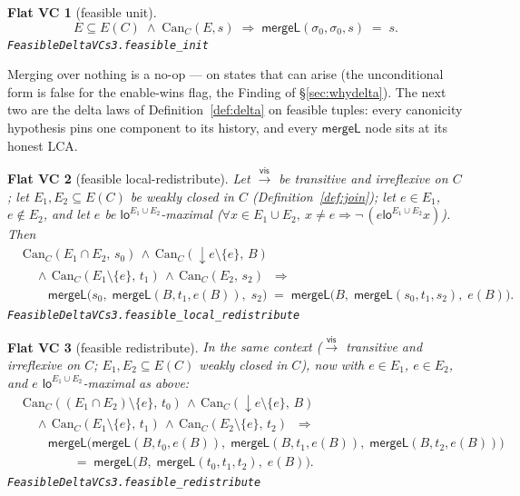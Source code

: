 \documentclass[11pt]{article}
\newtheorem{fvc}{Flat VC}
\newcommand{\vis}{\xrightarrow{\mathsf{vis}}}
\newcommand{\mergeL}{\mathsf{mergeL}}
\newcommand{\Sinit}{\sigma_0}
\newcommand{\loE}[1]{\mathsf{lo}^{#1}}
\newcommand{\dow}[1]{{\downarrow}#1}
\newcommand{\lean}[1]{\texttt{#1}}
\begin{document}
\begin{fvc}[feasible unit]
\label{fvc:unit}
\[
  E \subseteq E(C) \;\wedge\; \mathrm{Can}_C(E, s)
  \;\Longrightarrow\;
  \mergeL(\Sinit, \Sinit, s) \;=\; s .
\]
\hfill\lean{FeasibleDeltaVCs3.feasible\_init}
\end{fvc}

Merging over nothing is a no-op --- on states that can arise (the
unconditional form is false for the enable-wins flag, the Finding of
\S\ref{sec:whydelta}). The next two are the delta laws of
Definition~\ref{def:delta} on feasible tuples: every canonicity
hypothesis pins one component to its history, and every $\mergeL$ node
sits at its honest LCA.

\begin{fvc}[feasible local-redistribute]
\label{fvc:lredist}
Let $\vis$ be transitive and irreflexive on $C$; let
$E_1, E_2 \subseteq E(C)$ be weakly closed in $C$
(Definition~\ref{def:join}); let $e \in E_1$, $e \notin E_2$, and let
$e$ be $\loE{E_1 \cup E_2}$-maximal
($\forall x \in E_1 \cup E_2,\ x \neq e \Rightarrow
\neg\, (e \mathrel{\loE{E_1 \cup E_2}} x)$). Then
\[
\begin{aligned}
  &\mathrm{Can}_C(E_1 \cap E_2,\, s_0) \,\wedge\,
   \mathrm{Can}_C(\dow{e} \setminus \{e\},\, B) \\
  &\quad{}\wedge\,
   \mathrm{Can}_C(E_1 \setminus \{e\},\, t_1) \,\wedge\,
   \mathrm{Can}_C(E_2,\, s_2)
  \;\;\Longrightarrow\;\;\\
  &\qquad
   \mergeL\bigl(s_0,\; \mergeL(B, t_1, e(B)),\; s_2\bigr)
   \;=\;
   \mergeL\bigl(B,\; \mergeL(s_0, t_1, s_2),\; e(B)\bigr).
\end{aligned}
\]
\hfill\lean{FeasibleDeltaVCs3.feasible\_local\_redistribute}
\end{fvc}

\begin{fvc}[feasible redistribute]
\label{fvc:redist}
In the same context ($\vis$ transitive and irreflexive on $C$;
$E_1, E_2 \subseteq E(C)$ weakly closed in $C$), now with $e \in E_1$,
$e \in E_2$, and $e$ $\loE{E_1 \cup E_2}$-maximal as above:
\[
\begin{aligned}
  &\mathrm{Can}_C((E_1 \cap E_2) \setminus \{e\},\, t_0) \,\wedge\,
   \mathrm{Can}_C(\dow{e} \setminus \{e\},\, B) \\
  &\quad{}\wedge\,
   \mathrm{Can}_C(E_1 \setminus \{e\},\, t_1) \,\wedge\,
   \mathrm{Can}_C(E_2 \setminus \{e\},\, t_2)
  \;\;\Longrightarrow\;\;\\
  &\qquad
  \mergeL\bigl(\mergeL(B, t_0, e(B)),\; \mergeL(B, t_1, e(B)),\;
    \mergeL(B, t_2, e(B))\bigr) \\
  &\qquad\qquad=\;
  \mergeL\bigl(B,\; \mergeL(t_0, t_1, t_2),\; e(B)\bigr).
\end{aligned}
\]
\hfill\lean{FeasibleDeltaVCs3.feasible\_redistribute}
\end{fvc}
\end{document}
